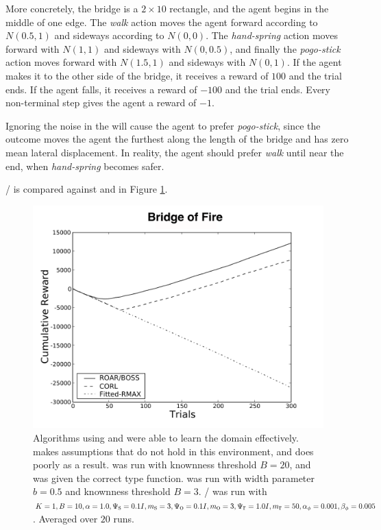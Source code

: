 More concretely, the bridge is a $2\times 10$ rectangle, and the agent begins in the middle of one edge. The \emph{walk} action moves the agent forward according to $N(0.5, 1)$ and sideways according to $N(0, 0)$. The \emph{hand-spring} action moves forward with $N(1,1)$ and sideways with $N(0,0.5)$, and finally the \emph{pogo-stick} action moves forward with $N(1.5,1)$ and sideways with $N(0,1)$. If the agent makes it to the other side of the bridge, it receives a reward of $100$ and the trial ends. If the agent falls, it receives a reward of $-100$ and the trial ends. Every non-terminal step gives the agent a reward of $-1$.


Ignoring the noise in the  will cause the agent to prefer \emph{pogo-stick}, since the outcome moves the agent the furthest along the length of the bridge and has zero mean lateral displacement. In reality, the agent should prefer \emph{walk} until near the end, when \emph{hand-spring} becomes safer.

/ is compared against  and  in Figure \ref{fig:bridge}.

\begin{figure}[t]
\vskip 0.2in
\begin{center}
\centerline{\includegraphics[width=\columnwidth]{bridgeFigure}}
\caption{Algorithms using  and  were able to learn the  domain effectively.  makes assumptions that do not hold in this environment, and does poorly as a result.  was run with knownness threshold $B=20$, and was given the correct type function.  was run with width parameter $b=0.5$ and knownness threshold $B=3$. / was run with $K=1, B=10, \alpha=1.0,\Psi_{\mbox s}=0.1I, m_{\mbox s}=3, \Psi_{\mbox o}=0.1I, m_{\mbox o}=3, \Psi_{\mbox r}=1.0I,m_{\mbox r}=50,\alpha_\phi=0.001,\beta_\phi=0.005$. Averaged over $20$ runs.}
\label{fig:bridge}
\end{center}
\vskip -0.2in
\end{figure} 

